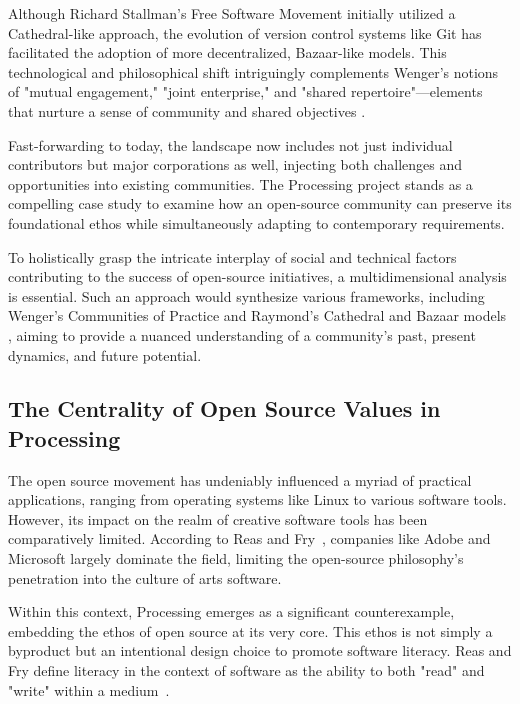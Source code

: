 \documentclass[draft]{article}
\begin{document}
Although Richard Stallman's Free Software Movement initially utilized a Cathedral-like approach, the evolution of version control systems like Git has facilitated the adoption of more decentralized, Bazaar-like models. This technological and philosophical shift intriguingly complements Wenger's notions of "mutual engagement," "joint enterprise," and "shared repertoire"—elements that nurture a sense of community and shared objectives \parencite{wengerCommunitiesPracticeLearning1998}.

Fast-forwarding to today, the landscape now includes not just individual contributors but major corporations as well, injecting both challenges and opportunities into existing communities. The Processing project stands as a compelling case study to examine how an open-source community can preserve its foundational ethos while simultaneously adapting to contemporary requirements.

To holistically grasp the intricate interplay of social and technical factors contributing to the success of open-source initiatives, a multidimensional analysis is essential. Such an approach would synthesize various frameworks, including Wenger's Communities of Practice \parencite{wengerCommunitiesPracticeLearning1998} and Raymond's Cathedral and Bazaar models \parencite{CathedralBazaarMusings2002a}, aiming to provide a nuanced understanding of a community's past, present dynamics, and future potential.




\subsection{The Centrality of Open Source Values in Processing}

The open source movement has undeniably influenced a myriad of practical applications, ranging from operating systems like Linux to various software tools. However, its impact on the realm of creative software tools has been comparatively limited. According to Reas and Fry~\parencite[30]{reasProcessingProgrammingHandbook2007}, companies like Adobe and Microsoft largely dominate the field, limiting the open-source philosophy's penetration into the culture of arts software. %

Within this context, Processing emerges as a significant counterexample, embedding the ethos of open source at its very core. This ethos is not simply a byproduct but an intentional design choice to promote software literacy. Reas and Fry define literacy in the context of software as the ability to both "read" and "write" within a medium~\parencite[29]{reasProcessingProgrammingHandbook2007}. %
\end{document}
